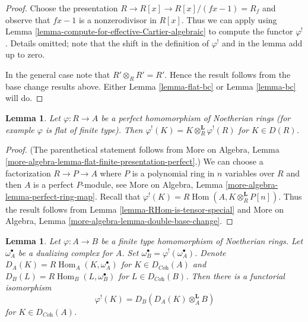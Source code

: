 \documentclass{stacks-project}
\theoremstyle{plain}
\newtheorem{lemma}[subsection]{Lemma}
\theoremstyle{definition}
\theoremstyle{remark}
\numberwithin{equation}{subsection}
\def\Hom{\mathop{\mathrm{Hom}}\nolimits}
\begin{document}
\begin{proof}
Choose the presentation $R \to R[x] \to R[x]/(fx - 1) = R_f$ and observe
that $fx - 1$ is a nonzerodivisor in $R[x]$. Thus we can apply
using Lemma \ref{lemma-compute-for-effective-Cartier-algebraic}
to compute the functor $\varphi^!$. Details omitted;
note that the shift in the definition
of $\varphi^!$ and in the lemma add up to zero.

\medskip\noindent
In the general case note that $R' \otimes_R R' = R'$.
Hence the result follows from the base change results
above. Either Lemma \ref{lemma-flat-bc} or
Lemma \ref{lemma-bc} will do.
\end{proof}

\begin{lemma}
\label{lemma-upper-shriek-is-tensor-functor}
Let $\varphi : R \to A$ be a perfect homomorphism of Noetherian rings
(for example $\varphi$ is flat of finite type).
Then $\varphi^!(K) = K \otimes_R^\mathbf{L} \varphi^!(R)$
for $K \in D(R)$.
\end{lemma}

\begin{proof}
(The parenthetical statement follows from
More on Algebra, Lemma
\ref{more-algebra-lemma-flat-finite-presentation-perfect}.)
We can choose a factorization $R \to P \to A$ where $P$ is a polynomial
ring in $n$ variables over $R$ and then $A$ is a perfect $P$-module, see
More on Algebra, Lemma \ref{more-algebra-lemma-perfect-ring-map}.
Recall that $\varphi^!(K) = R\Hom(A, K \otimes_R^\mathbf{L} P[n])$.
Thus the result follows from
Lemma \ref{lemma-RHom-is-tensor-special}
and More on Algebra, Lemma \ref{more-algebra-lemma-double-base-change}.
\end{proof}

\begin{lemma}
\label{lemma-relative-dualizing-if-have-omega}
Let $\varphi : A \to B$ be a finite type homomorphism of Noetherian rings.
Let $\omega_A^\bullet$ be a dualizing complex for $A$. Set
$\omega_B^\bullet = \varphi^!(\omega_A^\bullet)$. Denote
$D_A(K) = R\Hom_A(K, \omega_A^\bullet)$ for $K \in D_{\textit{Coh}}(A)$
and
$D_B(L) = R\Hom_B(L, \omega_B^\bullet)$ for $L \in D_{\textit{Coh}}(B)$.
Then there is a functorial isomorphism
$$
\varphi^!(K) = D_B(D_A(K) \otimes_A^\mathbf{L} B)
$$
for $K \in D_{\textit{Coh}}(A)$.
\end{lemma}
\end{document}
